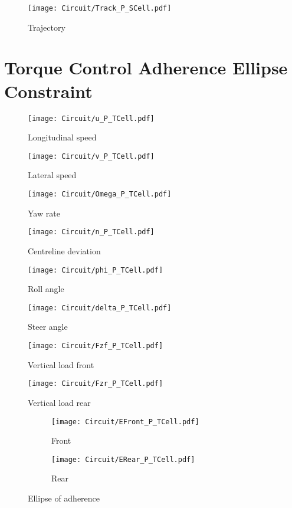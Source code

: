 %
%
\begin{figure}[!h]
    \centering
    \texttt{[image: Circuit/Track\_P\_SCell.pdf]}
    \caption{Trajectory}
    \label{fig:TrajSCE}
\end{figure}
%
\clearpage
%
\section{Torque Control Adherence Ellipse Constraint}
%
\begin{figure}[!h]
    \centering
    \texttt{[image: Circuit/u\_P\_TCell.pdf]}
    \caption{Longitudinal speed}
    \label{fig:uTCE}
\end{figure}
%
\begin{figure}[!h]
    \centering
    \texttt{[image: Circuit/v\_P\_TCell.pdf]}
    \caption{Lateral speed}
    \label{fig:vTCE}
\end{figure}
%
\begin{figure}[!h]
    \centering
    \texttt{[image: Circuit/Omega\_P\_TCell.pdf]}
    \caption{Yaw rate}
    \label{fig:OmegaTCE}
\end{figure}
%
\begin{figure}[!h]
    \centering
    \texttt{[image: Circuit/n\_P\_TCell.pdf]}
    \caption{Centreline deviation}
    \label{fig:nTCE}
\end{figure}
%
\begin{figure}[!h]
    \centering
    \texttt{[image: Circuit/phi\_P\_TCell.pdf]}
    \caption{Roll angle}
    \label{fig:phiTCE}
\end{figure}
%
\begin{figure}[!h]
    \centering
    \texttt{[image: Circuit/delta\_P\_TCell.pdf]}
    \caption{Steer angle}
    \label{fig:deltaTCE}
\end{figure}
%
\begin{figure}[!h]
    \centering
    \texttt{[image: Circuit/Fzf\_P\_TCell.pdf]}
    \caption{Vertical load front}
    \label{fig:FZFTCE}
\end{figure}
%
\begin{figure}[!h]
    \centering
    \texttt{[image: Circuit/Fzr\_P\_TCell.pdf]}
    \caption{Vertical load rear}
    \label{fig:FZFTCE}
\end{figure}
%
\begin{figure}[!h]
    \begin{subfigure}{0.5\linewidth}
        \texttt{[image: Circuit/EFront\_P\_TCell.pdf]}
        \caption{Front}
        \label{fig:FETCE}
    \end{subfigure}%
    \begin{subfigure}{0.5\linewidth}
        \texttt{[image: Circuit/ERear\_P\_TCell.pdf]}
        \caption{Rear}
        \label{fig:RETCE}
    \end{subfigure}
    \caption{Ellipse of adherence}
\end{figure}
